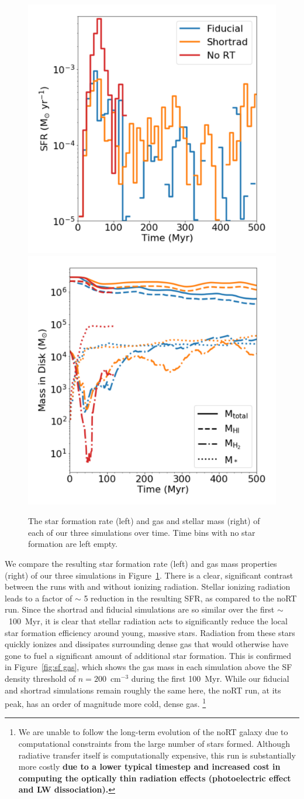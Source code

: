 \documentclass[twocolumn]{aastex62}
\begin{document}
\begin{figure}
\centering
\includegraphics[width=0.49\linewidth]{sfr}
\includegraphics[width=0.49\linewidth]{mass}
\caption{The star formation rate (left) and gas and stellar mass (right) of each of our three simulations over time. Time bins with no star formation are left empty.}
\label{fig:sfr_mass_evolution}
\end{figure}

We compare the resulting star formation rate (left) and gas mass properties (right) of our three simulations in Figure~\ref{fig:sfr_mass_evolution}. There is a clear, significant contrast between the runs with and without ionizing radiation. Stellar ionizing radiation leads to a factor of $\sim$ 5 reduction in the resulting SFR, as compared to the noRT run. Since the shortrad and fiducial simulations are so similar over the first $\sim$~100~Myr, it is clear that stellar radiation acts to significantly reduce the local star formation efficiency around young, massive stars. Radiation from these stars quickly ionizes and dissipates surrounding dense gas that would otherwise have gone to fuel a significant amount of additional star formation. This is confirmed in Figure~\ref{fig:sf gas}, which shows the gas mass in each simulation above the SF density threshold of $n = 200$~cm$^{-3}$ during the first 100~Myr. While our fiducial and shortrad simulations remain roughly the same here, the noRT run, at its peak, has an order of magnitude more cold, dense gas. \footnote{We are unable to follow the long-term evolution of the noRT galaxy due to computational constraints from the large number of stars formed. Although radiative transfer itself is computationally expensive, this run is substantially more costly \textbf{due to a lower typical timestep and increased cost in computing the optically thin radiation effects (photoelectric effect and LW dissociation).}}
\end{document}
